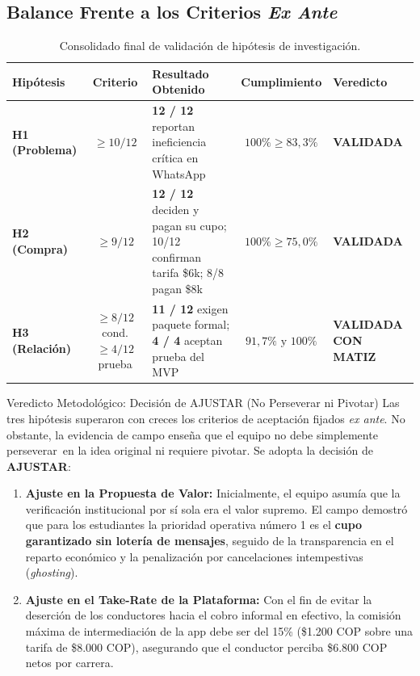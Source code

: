\documentclass[11pt,a4paper]{article}
\begin{document}
\subsection{Balance Frente a los Criterios \textit{Ex Ante}}
\begin{table}[!htbp]
\centering
\small
\renewcommand{\arraystretch}{1.2}
\begin{tabularx}{\textwidth}{p{2.5cm}c X c p{2.8cm}}
\toprule
\textbf{Hip\'otesis} & \textbf{Criterio} & \textbf{Resultado Obtenido} & \textbf{Cumplimiento} & \textbf{Veredicto} \\
\midrule
\textbf{H1 (Problema)} & $\ge 10 / 12$ & \textbf{12 / 12} reportan ineficiencia cr\'itica en WhatsApp & $100\% \ge 83,3\%$ & \textbf{\color{success}VALIDADA} \\
\midrule
\textbf{H2 (Compra)} & $\ge 9 / 12$ & \textbf{12 / 12} deciden y pagan su cupo; 10/12 confirman tarifa \$6k; 8/8 pagan \$8k & $100\% \ge 75,0\%$ & \textbf{\color{success}VALIDADA} \\
\midrule
\textbf{H3 (Relaci\'on)} & $\ge 8 / 12$ cond. $\ge 4 / 12$ prueba & \textbf{11 / 12} exigen paquete formal; \textbf{4 / 4} aceptan prueba del MVP & $91,7\% \text{ y } 100\%$ & \textbf{\color{warning}VALIDADA CON MATIZ} \\
\bottomrule
\end{tabularx}
\caption{Consolidado final de validaci\'on de hip\'otesis de investigaci\'on.}
\label{tab:resumen_hipotesis}
\end{table}

\begin{kbibox}{Veredicto Metodol\'ogico: Decisi\'on de AJUSTAR (No Perseverar ni Pivotar)}
Las tres hip\'otesis superaron con creces los criterios de aceptaci\'on fijados \textit{ex ante}. No obstante, la evidencia de campo ense\~na que el equipo no debe simplemente \guillemotleft perseverar\guillemotright\ en la idea original ni requiere \guillemotleft pivotar\guillemotright. Se adopta la decisi\'on de \textbf{AJUSTAR}:
\begin{enumerate}
    \item \textbf{Ajuste en la Propuesta de Valor:} Inicialmente, el equipo asum\'ia que la verificaci\'on institucional por s\'i sola era el valor supremo. El campo demostr\'o que para los estudiantes la prioridad operativa n\'umero 1 es el \textbf{cupo garantizado sin loter\'ia de mensajes}, seguido de la transparencia en el reparto econ\'omico y la penalizaci\'on por cancelaciones intempestivas (\textit{ghosting}).
    \item \textbf{Ajuste en el Take-Rate de la Plataforma:} Con el fin de evitar la deserci\'on de los conductores hacia el cobro informal en efectivo, la comisi\'on m\'axima de intermediaci\'on de la app debe ser del 15\% (\$1.200 COP sobre una tarifa de \$8.000 COP), asegurando que el conductor perciba \$6.800 COP netos por carrera.
\end{enumerate}
\end{kbibox}
\end{document}
